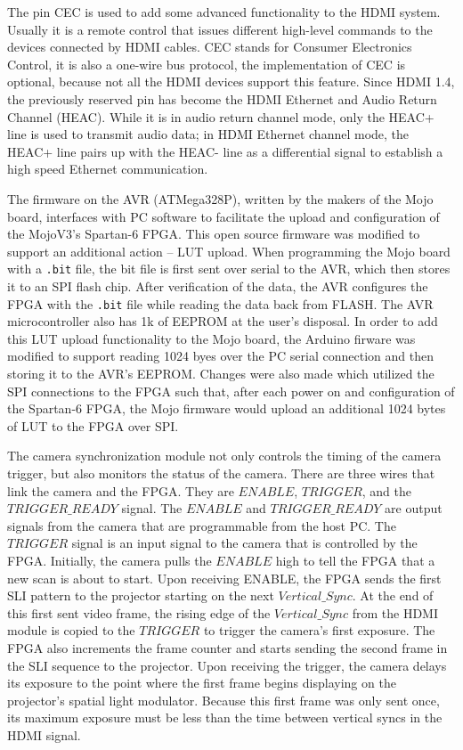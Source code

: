 \documentclass[]{spie}  %
\begin{document}
The pin CEC is used to add some advanced functionality to the HDMI system. Usually it is a remote control that issues different high-level commands to the devices connected by HDMI cables. CEC stands for Consumer Electronics Control, it is also a one-wire bus protocol, the implementation of CEC is optional, because not all the HDMI devices support this feature. Since HDMI 1.4, the previously reserved pin has become the HDMI Ethernet and Audio Return Channel (HEAC). While it is in audio return channel mode, only the HEAC+ line is used to transmit audio data; in HDMI Ethernet channel mode, the HEAC+ line pairs up with the HEAC- line as a differential signal to establish a high speed Ethernet communication.


The  firmware on the AVR (ATMega328P), written by the makers of the Mojo board, interfaces with PC software to facilitate the upload and configuration of the MojoV3's Spartan-6 FPGA. This open source firmware was modified to support an additional action -- LUT upload. When programming the Mojo board with a \texttt{.bit} file, the bit file is first sent over serial to the AVR, which then stores it to an SPI flash chip. After verification of the data, the AVR  configures the FPGA with the \texttt{.bit} file while reading the data back from FLASH. The AVR microcontroller also has 1k of EEPROM at the user's disposal. In order to add this LUT upload functionality to the Mojo board, the Arduino firware was modified to support reading 1024 byes over the PC serial connection and then storing it to the AVR's EEPROM. Changes were also made which utilized the SPI connections to the FPGA such that, after each power on and configuration of the Spartan-6 FPGA, the Mojo firmware would upload an additional 1024 bytes of LUT to the FPGA over SPI.


The camera synchronization module not only controls the timing of the camera trigger, but also monitors the status of the camera. There are three wires that link the camera and the FPGA. They are $ENABLE$, $TRIGGER$, and the $TRIGGER\_READY$ signal. The $ENABLE$ and $TRIGGER\_READY$ are output signals from the camera that are programmable from the host PC. The $TRIGGER$ signal is an input signal to the camera that is controlled by the FPGA. Initially, the camera pulls the $ENABLE$ high to tell the FPGA that a new scan is about to start. Upon receiving ENABLE, the FPGA sends the first SLI pattern to the projector starting on the next $Vertical\_Sync$. At the end of this first sent video frame, the rising edge of the $Vertical\_Sync$ from the HDMI module is copied to the $TRIGGER$ to trigger the camera's first exposure.  The FPGA also increments the frame counter and starts sending the second frame in the SLI sequence to the projector.  Upon receiving the trigger, the camera delays its exposure to the point where the first frame begins displaying on the projector's spatial light modulator.  Because this first frame was only sent once, its maximum exposure must be less than the time between vertical syncs in the HDMI signal. 
\end{document}
